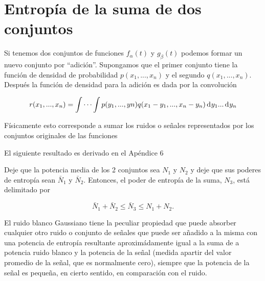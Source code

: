 
\section{Entrop\'ia de la suma de dos conjuntos}

	Si tenemos dos conjuntos de funciones $f_{\alpha}(t)$ y
	$g_{\beta}(t)$ podemos formar un nuevo conjunto por
	``adici\'on''. Supongamos que el primer conjunto tiene la
	funci\'on de densidad de probabilidad $p(x_{1},...,x_{n})$ y
	el segundo $q(x_{1},...,x_{n})$.  Despu\'es la funci\'on de
	densidad para la adici\'on es dada por la convoluci\'on
	
	\begin{equation} r(x_{1},...,x_{n}) = \int \cdots \int
		p(y_{1},...,y{n})q(x_{1}-y_{1},...,x_{n}-y_{n}) \diff y_{1}... \diff y_{n} \end{equation}
	
	F\'isicamente esto corresponde a sumar los ruidos o se\~nales
	representados por los conjuntos originales de las funciones
	
		
	El siguiente resultado es derivado en el Ap\'endice 6
	
    \begin{theorem} 

Deje que la potencia media de los 2 conjuntos sea $N_{1}$ y $N_{2}$ y
 deje que sus poderes de entrop\'ia sean $\bar{N}_1$ y
 $\bar{N}_2$. Entonces, el poder de entrop\'ia de la suma, $N_{3}$,
 est\'a delimitado por

\begin{equation} 
\bar{N}_1+\bar{N}_2 \le \bar{N}_3 \le N_{1} + N_{2}.
\end{equation} 
\end{theorem}
	
	El ruido blanco Gaussiano tiene la peculiar propiedad que
	puede absorber cualquier otro ruido o conjunto de se\~nales
	que puede ser a\~nadido a la misma con una potencia de
	entrop\'ia resultante aproxim\'adamente igual a la suma de a
	potencia ruido blanco y la potencia de la se\~nal (medida
	apartir del valor promedio de la se\~nal, que es normalmente
	cero), siempre que la potencia de la se\~{n}al es peque\~na,
	en cierto sentido, en comparaci\'on con el ruido.
	
